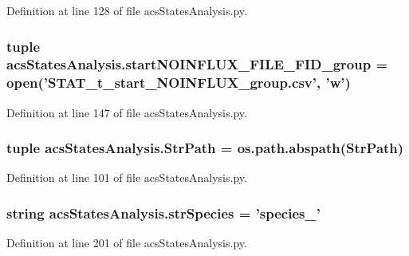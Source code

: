 Definition at line 128 of file acs\-States\-Analysis.\-py.

\hypertarget{a00098_a14eebfeaac72a017ee76d69b55033042}{
\subsubsection[{start\-N\-O\-I\-N\-F\-L\-U\-X\-\_\-\-F\-I\-L\-E\-\_\-\-F\-I\-D\-\_\-group}]{\setlength{\rightskip}{0pt plus 5cm}tuple acs\-States\-Analysis.\-start\-N\-O\-I\-N\-F\-L\-U\-X\-\_\-\-F\-I\-L\-E\-\_\-\-F\-I\-D\-\_\-group = open('S\-T\-A\-T\-\_\-t\-\_\-start\-\_\-\-N\-O\-I\-N\-F\-L\-U\-X\-\_\-group.\-csv', 'w')}}\label{a00098_a14eebfeaac72a017ee76d69b55033042}


Definition at line 147 of file acs\-States\-Analysis.\-py.

\hypertarget{a00098_ac34f3f43f888eb6620266d78ce928ceb}{
\subsubsection[{Str\-Path}]{\setlength{\rightskip}{0pt plus 5cm}tuple acs\-States\-Analysis.\-Str\-Path = os.\-path.\-abspath(Str\-Path)}}\label{a00098_ac34f3f43f888eb6620266d78ce928ceb}


Definition at line 101 of file acs\-States\-Analysis.\-py.

\hypertarget{a00098_ab14d209fe558e83aeede3b657a7241bb}{
\subsubsection[{str\-Species}]{\setlength{\rightskip}{0pt plus 5cm}string acs\-States\-Analysis.\-str\-Species = 'species\-\_\-'}}\label{a00098_ab14d209fe558e83aeede3b657a7241bb}


Definition at line 201 of file acs\-States\-Analysis.\-py.

